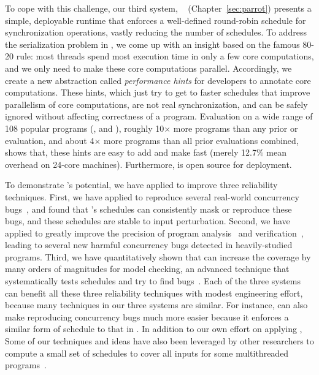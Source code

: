 To cope with this challenge, our third \smt system, \parrot~\cite{parrot:sosp13}
(Chapter~\ref{sec:parrot}) presents a simple, deployable runtime that enforces a
well-defined round-robin schedule for synchronization operations, vastly
reducing the number of schedules. To address the serialization problem in \smt,
we come up with an insight based on the famous 80-20 rule: most threads spend
most execution time in only a few core computations, and we only need to make 
these core computations parallel. Accordingly, we create a new abstraction
called \emph{performance hints} for developers to annotate core computations.
These hints, which just try to get to faster schedules that improve parallelism
of core computations, are not real synchronization, and can be safely ignored
without affecting correctness of a program. Evaluation on a wide range of 108
popular programs (\eg, \bdb and \mplayer), roughly 10$\times$ more programs than
any prior \smt or \dmt evaluation, and about 4$\times$ more programs than all
prior evaluations combined, shows that, these hints are easy to add and make
\parrot fast (merely 12.7\% mean overhead on 24-core machines). Furthermore,
\parrot is open source for deployment.


To demonstrate \smt's potential, we have applied \smt to improve three
reliability techniques. First, we have applied \tern to reproduce several
real-world concurrency bugs~\cite{cui:tern:osdi10}, and found that \smt's
schedules can consistently mask or reproduce these bugs, and these schedules are
stable to input perturbation. Second, we have applied \peregrine to greatly
improve the precision of program analysis~\cite{wu:pldi12} and
verification~\cite{wu:pldi12}, leading to several new harmful concurrency bugs
detected in heavily-studied programs. Third, we have quantitatively shown that
\parrot can increase the coverage by many orders of magnitudes for model
checking, an advanced technique that systematically tests schedules and try to
find bugs~\cite{parrot:sosp13, dbug:spin11, modist:nsdi09}. Each of the three
systems can benefit all these three reliability techniques with modest
engineering effort, because many techniques in our three \smt systems are
similar. For instance, \parrot can also make reproducing concurrency bugs much
more easier because it enforces a similar form of schedule to that in \tern. In
addition to our own effort on applying \smt, Some of our \smt techniques and
ideas have also been leveraged by other researchers to compute a small set of
schedules to cover all inputs for some multithreaded
programs~\cite{bergan:oopsla13}.

